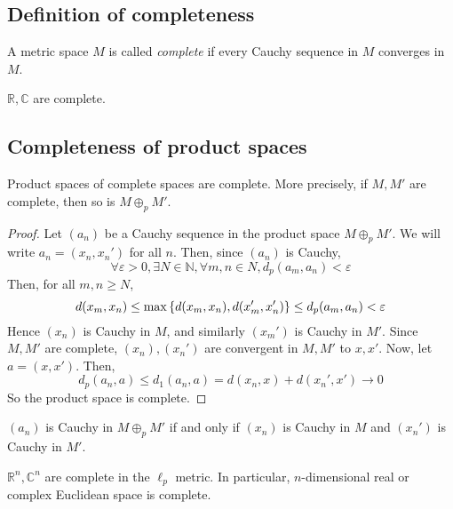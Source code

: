 \subsection{Definition of completeness}
\begin{definition}
	A metric space \( M \) is called \textit{complete} if every Cauchy sequence in \( M \) converges in \( M \).
\end{definition}
\begin{example}
	\( \mathbb R, \mathbb C \) are complete.
\end{example}

\subsection{Completeness of product spaces}
\begin{proposition}
	Product spaces of complete spaces are complete.
	More precisely, if \( M, M' \) are complete, then so is \( M \oplus_p M' \).
\end{proposition}
\begin{proof}
	Let \( (a_n) \) be a Cauchy sequence in the product space \( M \oplus_p M' \).
	We will write \( a_n = (x_n, x_n') \) for all \( n \).
	Then, since \( (a_n) \) is Cauchy,
	\[
		\forall \varepsilon > 0, \exists N \in \mathbb N, \forall m,n \in N, d_p(a_m, a_n) < \varepsilon
	\]
	Then, for all \( m, n \geq N \),
	\[
		d(x_m,x_n) \leq \max\qty{d(x_m,x_n), d(x_m', x_n')} \leq d_p(a_m,a_n) < \varepsilon
	\]
	Hence \( (x_n) \) is Cauchy in \( M \), and similarly \( (x_m') \) is Cauchy in \( M' \).
	Since \( M, M' \) are complete, \( (x_n), (x_n') \) are convergent in \( M, M' \) to \( x, x' \).
	Now, let \( a = (x,x') \).
	Then,
	\[
		d_p(a_n,a) \leq d_1(a_n,a) = d(x_n,x) + d(x_n',x') \to 0
	\]
	So the product space is complete.
\end{proof}
\begin{remark}
	\( (a_n) \) is Cauchy in \( M \oplus_p M' \) if and only if \( (x_n) \) is Cauchy in \( M \) and \( (x_n') \) is Cauchy in \( M' \).
\end{remark}
\begin{corollary}
	\( \mathbb R^n, \mathbb C^n \) are complete in the \( \ell_p \) metric.
	In particular, \( n \)-dimensional real or complex Euclidean space is complete.
\end{corollary}

